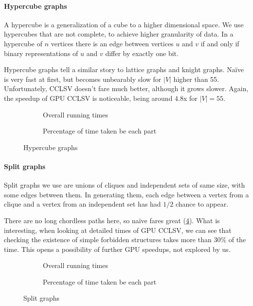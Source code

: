 \paragraph{Hypercube graphs}

A hypercube is a generalization of a cube to a higher dimensional space. We use hypercubes that are not complete, to achieve higher granularity of data. In a hypercube of $n$ vertices there is an edge between vertices $u$ and $v$ if and only if binary representations of $u$ and $v$ differ by exactly one bit.

Hypercube graphs tell a similar story to lattice graphs and knight graphs. Na\"ive is very fast at first, but becomes unbearably slow for $|V|$ higher than 55. Unfortunately, CCLSV doesn't fare much better, although it grows slower. Again, the speedup of GPU CCLSV is noticeable, being around 4.8x for $|V| = 55$.

\begin{figure}
  \begin{subfigure}{\textwidth}
    \centering
    
    \caption{Overall running times}
    \label{plot:hypercubeLines}
  \end{subfigure}

  \begin{subfigure}{\textwidth}
    \centering
    
    \caption{Percentage of time taken be each part}
    \label{plot:hypercubeDet}
  \end{subfigure}
  \caption{Hypercube graphs}
\end{figure}

\paragraph{Split graphs}

Split graphs we use are unions of cliques and independent sets of same size, with some edges between them. In generating them, each edge between a vertex from a clique and a vertex from an independent set has had $1/2$ chance to appear.

There are no long chordless paths here, so na\"ive fares great (\cref{plot:splitLines}). What is interesting, when looking at detailed times of GPU CCLSV, we can see that checking the existence of simple forbidden structures takes more than 30\% of the time. This opens a possibility of further GPU speedups, not explored by us.

\begin{figure}
  \begin{subfigure}{\textwidth}
    \centering
    
    \caption{Overall running times}
    \label{plot:splitLines}
  \end{subfigure}

  \begin{subfigure}{\textwidth}
    \centering
    
    \caption{Percentage of time taken be each part}
    \label{plot:splitDet}
  \end{subfigure}
  \caption{Split graphs}
\end{figure}

